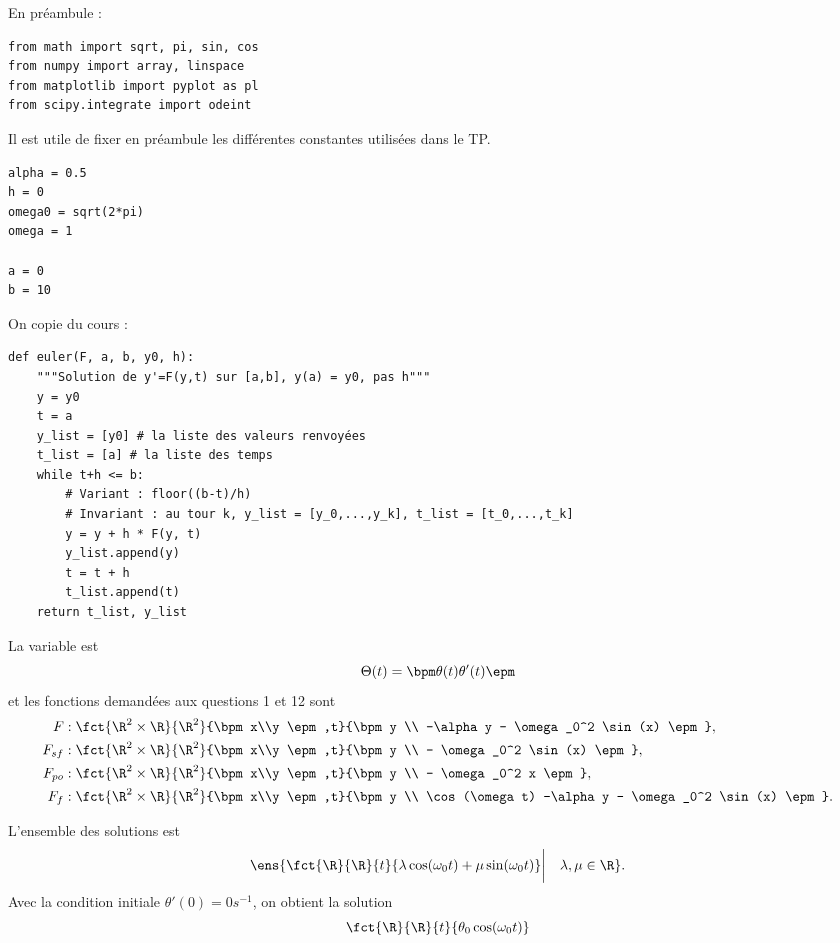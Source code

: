 En préambule : 
\begin{lstlisting}
from math import sqrt, pi, sin, cos
from numpy import array, linspace
from matplotlib import pyplot as pl
from scipy.integrate import odeint
\end{lstlisting}

Il est utile de fixer en préambule les différentes constantes utilisées dans le TP.
\begin{lstlisting}
alpha = 0.5
h = 0
omega0 = sqrt(2*pi)
omega = 1

a = 0
b = 10
\end{lstlisting}

On copie du cours : 
\begin{lstlisting}
def euler(F, a, b, y0, h):
    """Solution de y'=F(y,t) sur [a,b], y(a) = y0, pas h"""
    y = y0
    t = a
    y_list = [y0] # la liste des valeurs renvoyées
    t_list = [a] # la liste des temps
    while t+h <= b:
        # Variant : floor((b-t)/h)
        # Invariant : au tour k, y_list = [y_0,...,y_k], t_list = [t_0,...,t_k]
        y = y + h * F(y, t)
        y_list.append(y)
        t = t + h
        t_list.append(t)
    return t_list, y_list
\end{lstlisting}

\question{}
La variable est 
\begin{equation*}
  \Theta(t) = \bpm \theta(t) \\ \theta'(t) \epm
\end{equation*}
et les fonctions demandées aux questions 1 et 12 sont 
\begin{align*}
  F&:\fct{\R^2\times \R}{\R^2}{\bpm x\\y \epm,t}{\bpm y \\ -\alpha y - \omega_0^2 \sin(x) \epm},\\
  F_{sf}&:\fct{\R^2\times \R}{\R^2}{\bpm x\\y \epm,t}{\bpm y \\ - \omega_0^2 \sin(x) \epm},\\
  F_{po}&:\fct{\R^2\times \R}{\R^2}{\bpm x\\y \epm,t}{\bpm y \\ - \omega_0^2 x \epm},\\
  F_{f}&:\fct{\R^2\times \R}{\R^2}{\bpm x\\y \epm,t}{\bpm y \\ \cos(\omega t) -\alpha y - \omega_0^2 \sin(x) \epm}.
\end{align*}

\question{}
L'ensemble des solutions est 
\begin{equation*}
  \ens{\fct{\R}{\R}{t}{\lambda \cos(\omega_0 t) + \mu \sin(\omega_0 t)} \bigg| \quad\lambda,\mu \in \R}.
\end{equation*}
Avec la condition initiale $\theta'(0) = 0 s^{-1}$, on obtient la solution 
\begin{equation*}
  \fct{\R}{\R}{t}{ \theta_0 \cos(\omega_0 t)}
\end{equation*}

